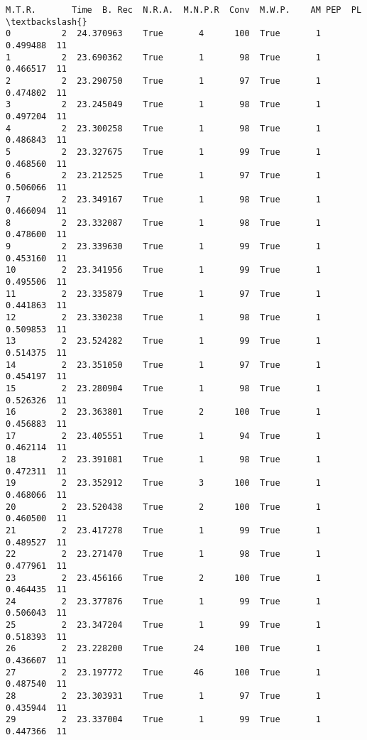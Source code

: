 \documentclass[11pt]{article}
\begin{document}
    \begin{Verbatim}[commandchars=\\\{\}]
      M.T.R.       Time  B. Rec  N.R.A.  M.N.P.R  Conv  M.W.P.    AM PEP  PL  \textbackslash{}
0          2  24.370963    True       4      100  True       1  0.499488  11   
1          2  23.690362    True       1       98  True       1  0.466517  11   
2          2  23.290750    True       1       97  True       1  0.474802  11   
3          2  23.245049    True       1       98  True       1  0.497204  11   
4          2  23.300258    True       1       98  True       1  0.486843  11   
5          2  23.327675    True       1       99  True       1  0.468560  11   
6          2  23.212525    True       1       97  True       1  0.506066  11   
7          2  23.349167    True       1       98  True       1  0.466094  11   
8          2  23.332087    True       1       98  True       1  0.478600  11   
9          2  23.339630    True       1       99  True       1  0.453160  11   
10         2  23.341956    True       1       99  True       1  0.495506  11   
11         2  23.335879    True       1       97  True       1  0.441863  11   
12         2  23.330238    True       1       98  True       1  0.509853  11   
13         2  23.524282    True       1       99  True       1  0.514375  11   
14         2  23.351050    True       1       97  True       1  0.454197  11   
15         2  23.280904    True       1       98  True       1  0.526326  11   
16         2  23.363801    True       2      100  True       1  0.456883  11   
17         2  23.405551    True       1       94  True       1  0.462114  11   
18         2  23.391081    True       1       98  True       1  0.472311  11   
19         2  23.352912    True       3      100  True       1  0.468066  11   
20         2  23.520438    True       2      100  True       1  0.460500  11   
21         2  23.417278    True       1       99  True       1  0.489527  11   
22         2  23.271470    True       1       98  True       1  0.477961  11   
23         2  23.456166    True       2      100  True       1  0.464435  11   
24         2  23.377876    True       1       99  True       1  0.506043  11   
25         2  23.347204    True       1       99  True       1  0.518393  11   
26         2  23.228200    True      24      100  True       1  0.436607  11   
27         2  23.197772    True      46      100  True       1  0.487540  11   
28         2  23.303931    True       1       97  True       1  0.435944  11   
29         2  23.337004    True       1       99  True       1  0.447366  11   

\end{Verbatim}
\end{document}
